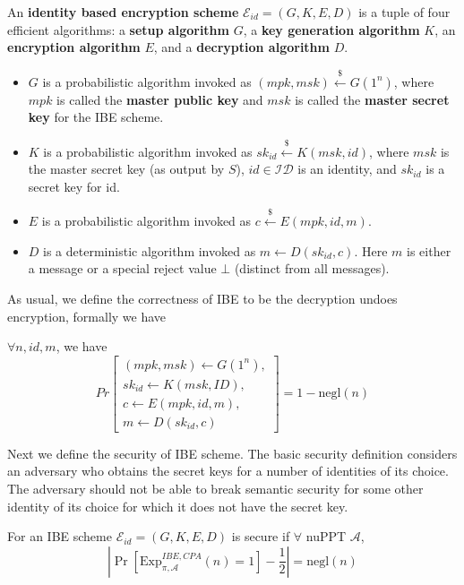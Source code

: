\begin{definition}
    An \textbf{identity based encryption scheme} $\mathcal{E}_{id} = (G,K,E,D)$ is a tuple of four efficient algorithms: a \textbf{setup algorithm} $G$, a \textbf{key generation algorithm} $K$, an \textbf{encryption algorithm} $E$, and a \textbf{decryption algorithm} $D$.
    \begin{itemize}
        \item $G$ is a probabilistic algorithm invoked as $(mpk, msk)\stackrel{\$}{\gets} G(1^n)$, where $mpk$ is called the \textbf{master public key} and $msk$ is called the \textbf{master secret key} for the IBE scheme.
        \item $K$ is a probabilistic algorithm invoked as $sk_{id}\stackrel{\$}{\gets}K(msk,id )$, where $msk$ is the master secret key (as output by $S$), $id \in \mathcal{ID}$ is an identity, and $sk_{id}$ is a secret key for id.
        \item $E$ is a probabilistic algorithm invoked as $c\stackrel{\$}{\gets}E(mpk,id, m)$.
        \item $D$ is a deterministic algorithm invoked as $m\gets D(sk_{id}, c)$. Here $m$ is either a message or a special reject value $\bot$ (distinct from all messages).
    \end{itemize}
\end{definition}

As usual, we define the correctness of IBE to be the decryption undoes encryption, formally we have 
\begin{definition}
$\forall n, id, m$, we have
\[
Pr\begin{bmatrix}
   (mpk,msk) \gets G(1^n), \\[0.3em]
   sk_{id} \gets K(msk, ID), \\[0.3em]
   c \gets E(mpk, id, m), \\[0.3em]
   m \gets D(sk_{id}, c)
\end{bmatrix}
  =1 - \text{negl}(n)
\]
\end{definition}

Next we define the security of IBE scheme. 
The basic security definition considers an adversary who obtains the secret keys for a number of identities of its choice. 
The adversary should not be able to break semantic security for some other identity of its choice for which it does not have the secret key.

\begin{definition}
    For an IBE scheme $\mathcal{E}_{id}=(G,K,E,D)$ is secure if $\forall$ nuPPT $\mathcal{A}$,
    \[
    |\Pr[\text{Exp}_{\pi,\mathcal{A}}^{IBE,CPA}(n)=1]-\frac{1}{2}|=\text{negl}(n)
    \]
\end{definition}

